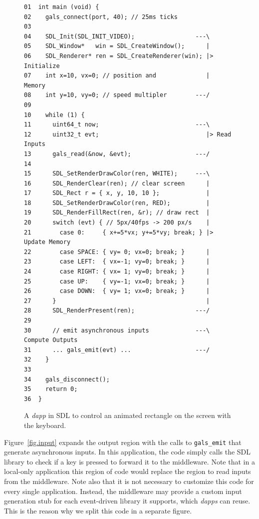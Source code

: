 \documentclass[sigplan,screen]{acmart}
\newcommand{\dapp}{\emph{dapp}\xspace}
\newcommand{\dapps}{\emph{dapps}\xspace}
\begin{document}
\begin{figure}[t]
{\scriptsize
\begin{verbatim}
01  int main (void) {
02    gals_connect(port, 40); // 25ms ticks
03
04    SDL_Init(SDL_INIT_VIDEO);                 ---\
05    SDL_Window*   win = SDL_CreateWindow();      |
06    SDL_Renderer* ren = SDL_CreateRenderer(win); |> Initialize
07    int x=10, vx=0; // position and              |    Memory
08    int y=10, vy=0; // speed multipler        ---/
09
10    while (1) {
11      uint64_t now;                           ---\
12      uint32_t evt;                              |> Read Inputs
13      gals_read(&now, &evt);                  ---/
14
15      SDL_SetRenderDrawColor(ren, WHITE);     ---\
16      SDL_RenderClear(ren); // clear screen      |
17      SDL_Rect r = { x, y, 10, 10 };             |
18      SDL_SetRenderDrawColor(ren, RED);          |
19      SDL_RenderFillRect(ren, &r); // draw rect  |
20      switch (evt) { // 5px/40fps -> 200 px/s    |
21        case 0:     { x+=5*vx; y+=5*vy; break; } |> Update Memory
22        case SPACE: { vy= 0; vx=0; break; }      |
23        case LEFT:  { vx=-1; vy=0; break; }      |
24        case RIGHT: { vx= 1; vy=0; break; }      |
25        case UP:    { vy=-1; vx=0; break; }      |
26        case DOWN:  { vy= 1; vx=0; break; }      |
27      }                                          |
28      SDL_RenderPresent(ren);                 ---/
29
30      // emit asynchronous inputs             ---\  Compute Outputs
31      ... gals_emit(evt) ...                  ---/
32    }
33
34    gals_disconnect();
35    return 0;
36  }
\end{verbatim}
}
  \caption{
    \label{fig.sdl}
    A \dapp in SDL to control an animated rectangle on the screen with the keyboard.
  }
\end{figure}

Figure~\ref{fig.input} expands the output region with the calls to
\texttt{gals\_emit} that generate asynchronous inputs.
In this application, the code simply calls the SDL library to check if a key is
pressed to forward it to the middleware.
Note that in a local-only application this region of code would replace the
region to read inputs from the middleware.
Note also that it is not necessary to customize this code for every single
application.
Instead, the middleware may provide a custom input generation stub for each
event-driven library it supports, which \dapps can reuse.
This is the reason why we split this code in a separate figure.
\end{document}
